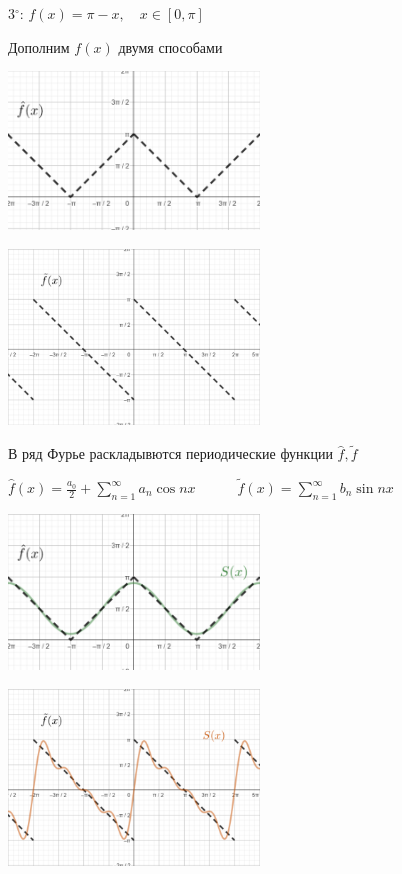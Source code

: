 \documentclass[12pt]{article}
\begin{document}
    3$^\circ$: $f(x) = \pi - x, \quad x \in [0, \pi]$

    Дополним $f(x)$ двумя способами

    \begin{multicols}{2}
        \includegraphics[width=0.5\textwidth]{addchapters1/images/addchapters1_2024_11_15_4}

        \includegraphics[width=0.5\textwidth]{addchapters1/images/addchapters1_2024_11_15_3}
    \end{multicols}

    В ряд Фурье раскладывются периодические функции $\hat{f}, \tilde{f}$

    \Lab $\hat{f}(x) = \frac{a_0}{2} + \sum_{n = 1}^\infty a_n \cos nx \quad\quad\quad \tilde{f}(x) = \sum_{n = 1}^\infty b_n \sin nx$

    \mediumvspace

    \begin{multicols}{2}
        \includegraphics[width=0.5\textwidth]{addchapters1/images/addchapters1_2024_11_15_5}

        \includegraphics[width=0.5\textwidth]{addchapters1/images/addchapters1_2024_11_15_6}
    \end{multicols}
\end{document}
